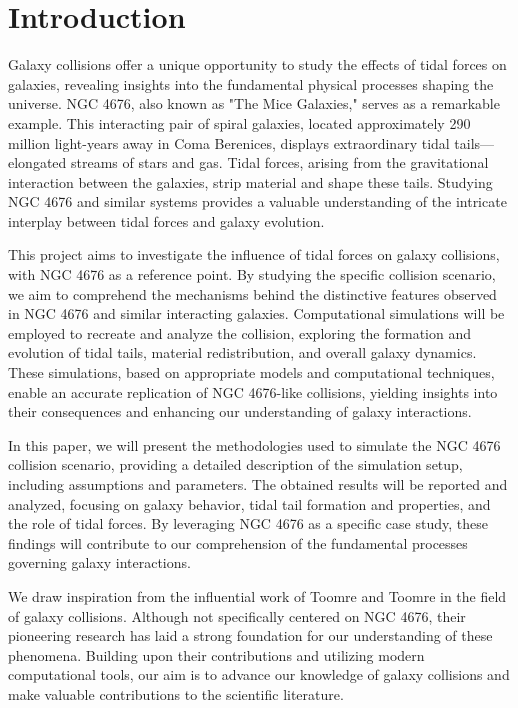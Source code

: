 \documentclass[reprint, amsmath, amssymb, aps]{revtex4-2}
\begin{document}
\maketitle

\section{Introduction}
\label{sec:intro}

Galaxy collisions offer a unique opportunity to study the effects of tidal forces on galaxies, revealing insights into the fundamental physical processes shaping the universe. NGC 4676, also known as "The Mice Galaxies," serves as a remarkable example. This interacting pair of spiral galaxies, located approximately 290 million light-years away in Coma Berenices, displays extraordinary tidal tails—elongated streams of stars and gas. Tidal forces, arising from the gravitational interaction between the galaxies, strip material and shape these tails. Studying NGC 4676 and similar systems provides a valuable understanding of the intricate interplay between tidal forces and galaxy evolution.

This project aims to investigate the influence of tidal forces on galaxy collisions, with NGC 4676 as a reference point. By studying the specific collision scenario, we aim to comprehend the mechanisms behind the distinctive features observed in NGC 4676 and similar interacting galaxies. Computational simulations will be employed to recreate and analyze the collision, exploring the formation and evolution of tidal tails, material redistribution, and overall galaxy dynamics. These simulations, based on appropriate models and computational techniques, enable an accurate replication of NGC 4676-like collisions, yielding insights into their consequences and enhancing our understanding of galaxy interactions.

In this paper, we will present the methodologies used to simulate the NGC 4676 collision scenario, providing a detailed description of the simulation setup, including assumptions and parameters. The obtained results will be reported and analyzed, focusing on galaxy behavior, tidal tail formation and properties, and the role of tidal forces. By leveraging NGC 4676 as a specific case study, these findings will contribute to our comprehension of the fundamental processes governing galaxy interactions.

We draw inspiration from the influential work of Toomre and Toomre \cite{to03000u} in the field of galaxy collisions. Although not specifically centered on NGC 4676, their pioneering research has laid a strong foundation for our understanding of these phenomena. Building upon their contributions and utilizing modern computational tools, our aim is to advance our knowledge of galaxy collisions and make valuable contributions to the scientific literature.
\end{document}
